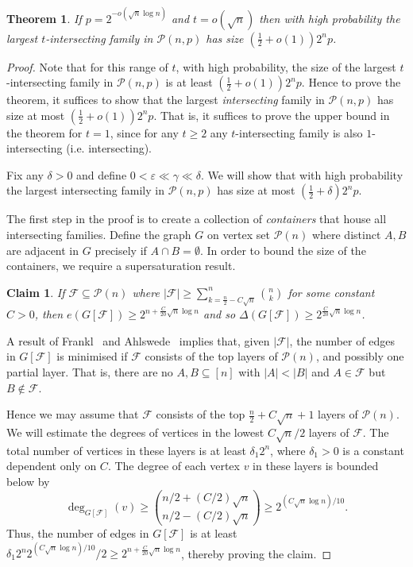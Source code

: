 \documentclass[11pt]{article}
\newtheorem{claim}[theorem]{Claim}
\newtheorem{thm}[theorem]{Theorem}
\numberwithin{equation}{section}
\def\eps{\varepsilon}
\begin{document}
\begin{thm}
If $p=2^{-o(\sqrt{n}\log n)}$ and $t=o(\sqrt{n})$ then with high probability the largest $t$-intersecting family in $\mathcal P(n,p)$ has size $(\frac{1}{2}+o(1))2^np$.
\end{thm}
\begin{proof}

Note that for this range of $t$,  with high probability, the size of the largest $t$-intersecting family in $\mathcal P(n,p)$ is at least $(\frac{1}{2}+o(1))2^np$. Hence to prove the theorem, it suffices to show  that the largest \emph{intersecting} family  in $\mathcal P(n,p)$ has size at most $(\frac{1}{2}+o(1))2^np$. That is, it suffices to prove the upper bound in the theorem for $t=1$, since for any $t\geq 2$ any $t$-intersecting family is also $1$-intersecting (i.e. intersecting).

 Fix any $\delta>0$ and define $0<\eps \ll \gamma \ll \delta$. We will show that with high probability the largest intersecting family in $\mathcal P(n,p)$ has size at most $(\frac{1}{2}+\delta)2^np$.

The first step in the proof is to create a collection of \emph{containers} that house all intersecting families. Define the graph $G$ on vertex set $\mathcal{P}(n)$ where distinct $A,B$ are adjacent in $G$ precisely if $A\cap B=\emptyset$. In order to bound the size of the containers, we require a supersaturation result. 

\begin{claim}\label{cd}
 If $\mathcal{F}\subseteq \mathcal{P}(n)$ where $|\mathcal{F}|\geq \sum_{k=\frac{n}{2}-C\sqrt{n}}^n \binom{n}{k}$ for some constant $C>0$, then 
 $e(G[\mathcal{F}])\geq 2^{n+\frac{C}{20}\sqrt{n}\log n}$ and so
$\Delta(G[\mathcal{F}])\geq 2^{\frac{C}{20}\sqrt{n}\log n}$.
\end{claim}
A result of Frankl~\cite{frank} and Ahlswede~\cite{ash} implies that,
 given $|\mathcal{F}|$, the number of edges in $G[\mathcal{F}]$ is minimised if $\mathcal{F}$ consists of the top layers of $\mathcal P(n)$, and possibly one partial layer. That is, there are no $A,B\subseteq [n]$ with $|A|<|B|$ and $A\in\mathcal{F}$ but $B\notin \mathcal{F}$. 

Hence we may assume that $\mathcal{F}$ consists of the top $\frac{n}{2}+C\sqrt{n}+1$ layers of $\mathcal{P}(n)$. We will estimate the degrees of vertices in the lowest $C\sqrt{n}/2$ layers of $\mathcal{F}$. The total number of vertices in these layers is at least $\delta_1 2^n$, where $\delta_1>0$ is a constant dependent only on $C$. The degree of each vertex $v$ in these layers is bounded below by $$\deg _{G[\mathcal F]}(v)\geq \binom{n/2+(C/2)\sqrt{n}}{n/2-(C/2)\sqrt{n}}\geq 2^{(C \sqrt{n}\log{n})/10}.$$
Thus, the number of edges in $G[\mathcal{F}]$ is at least $\delta_1 2^n 2^{(C\sqrt{n}\log n)/10}/2\geq 2^{n+\frac{C}{20}\sqrt{n}\log n}$, thereby proving the claim.




\end{proof}
\end{document}
